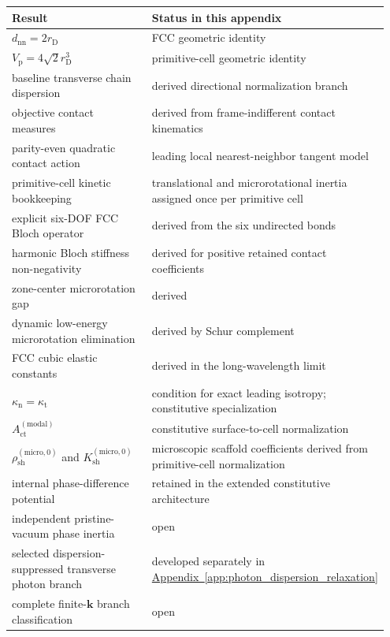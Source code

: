 \begin{table}[h!]
\centering
\renewcommand{\arraystretch}{1.3}
\begin{tabular}{p{0.45\linewidth} p{0.5\linewidth}}
\hline
\textbf{Result} & \textbf{Status in this appendix} \\
\hline
$d_{\mathrm{nn}}=2r_{\mathrm{D}}$ & FCC geometric identity \\
$V_{\mathrm{p}}=4\sqrt{2}r_{\mathrm{D}}^{3}$ & primitive-cell geometric identity \\
baseline transverse chain dispersion & derived directional normalization branch \\
objective contact measures & derived from frame-indifferent contact kinematics \\
parity-even quadratic contact action & leading local nearest-neighbor tangent model \\
primitive-cell kinetic bookkeeping & translational and microrotational inertia assigned once per primitive cell \\
explicit six-DOF FCC Bloch operator & derived from the six undirected bonds \\
harmonic Bloch stiffness non-negativity & derived for positive retained contact coefficients \\
zone-center microrotation gap & derived \\
dynamic low-energy microrotation elimination & derived by Schur complement \\
FCC cubic elastic constants & derived in the long-wavelength limit \\
$\kappa_{\mathrm{n}}=\kappa_{\mathrm{t}}$ & condition for exact leading isotropy; constitutive specialization \\
$A_{\mathrm{ct}}^{(\mathrm{modal})}$ & constitutive surface-to-cell normalization \\
$\rho_{\mathrm{sh}}^{(\mathrm{micro},0)}$ and $K_{\mathrm{sh}}^{(\mathrm{micro},0)}$ & microscopic scaffold coefficients derived from primitive-cell normalization \\
internal phase-difference potential & retained in the extended constitutive architecture \\
independent pristine-vacuum phase inertia & open \\
selected dispersion-suppressed transverse photon branch & developed separately in \hyperref[app:photon_dispersion_relaxation]{Appendix~\ref*{app:photon_dispersion_relaxation}} \\
complete finite-$\mathbf{k}$ branch classification & open \\
\hline
\end{tabular}
\end{table}

